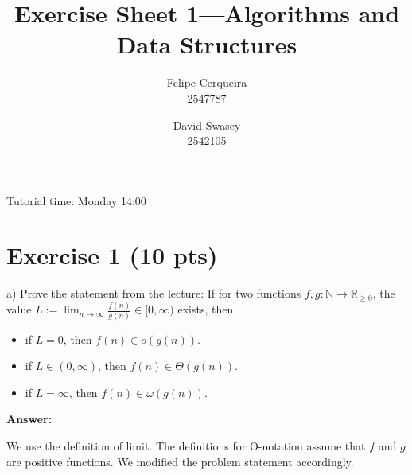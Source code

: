 \documentclass[a4paper]{article}
\title{Exercise Sheet 1---Algorithms and Data Structures}
\author{Felipe Cerqueira \\ 2547787 \and David Swasey \\ 2542105}
\newcommand{\RR}{\mathbb{R}}
\newcommand{\NN}{\mathbb{N}}
\newcommand{\RP}{\RR_{\ge 0}}
\begin{document}
\maketitle

Tutorial time: Monday 14:00

\section{Exercise 1 (10 pts)}

\noindent a) Prove the statement from the lecture: If for two functions $f, g: \NN \to \RP$, the value $L := \lim_{n \to \infty} \frac{f(n)}{g(n)} \in [0, \infty)$ exists, then

\begin{itemize}
\item if $L = 0$, then $f(n) \in o(g(n))$.
\item if $L \in (0, \infty)$, then $f(n) \in \Theta(g(n))$.
\item if $L = \infty$, then $f(n) \in \omega(g(n))$.
\end{itemize}

\bigskip \noindent \textbf{Answer:}

We use the definition of limit.
The definitions for O-notation assume that $f$ and $g$ are positive functions.
We modified the problem statement accordingly.
\end{document}
